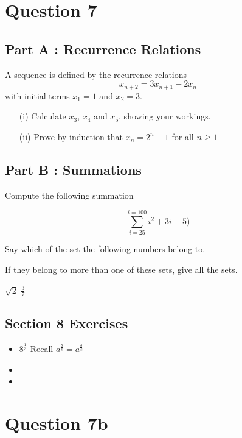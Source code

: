 \documentclass[]{report}
\begin{document}

\section*{Question 7}
\subsection*{Part A : Recurrence Relations}
A sequence is defined by the recurrence relations
\[x_{n+2}  = 3x_{n+1} - 2x_n\]
with initial terms $x_1 = 1$ and $x_2=3$.

\begin{itemize}
\item[(i)] Calculate $x_3$, $x_4$ and $x_5$, showing your workings.
\item[(ii)] Prove by induction that $x_n = 2^n - 1$ for all $n \geq 1$
\end{itemize}

\subsection*{Part B : Summations}

Compute the following summation

\[ \sum^{i=100}_{i=25} i^2 + 3i -5)\]


Say which of the set the following numbers belong to.

If they belong to more than one of these sets, give all the sets.

$\sqrt{2}$
$\frac{3}{7}$




\subsection*{Section 8 Exercises}
\begin{itemize}
\item $8^{\frac{1}{3}}$ Recall $a^{\frac{b}{c}} = a^{\frac{b}{c}}$
\item
\item
\end{itemize}





\section*{Question 7b}
\end{document}
